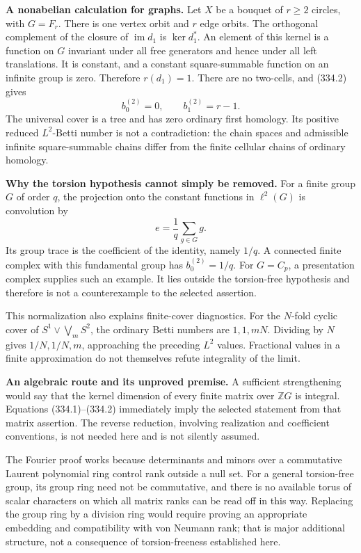 \documentclass[11pt]{article}
\begin{document}
\textbf{A nonabelian calculation for graphs.} Let $X$ be a bouquet of $r\geq2$ circles, with $G=F_r$. There is one vertex orbit and $r$ edge orbits. The orthogonal complement of the closure of $\operatorname{im}d_1$ is $\ker d_1^*$. An element of this kernel is a function on $G$ invariant under all free generators and hence under all left translations. It is constant, and a constant square-summable function on an infinite group is zero. Therefore $r(d_1)=1$. There are no two-cells, and (334.2) gives
\[
 b_0^{(2)}=0,\qquad b_1^{(2)}=r-1.
\]
The universal cover is a tree and has zero ordinary first homology. Its positive reduced $L^2$-Betti number is not a contradiction: the chain spaces and admissible infinite square-summable chains differ from the finite cellular chains of ordinary homology.

\textbf{Why the torsion hypothesis cannot simply be removed.} For a finite group $G$ of order $q$, the projection onto the constant functions in $\ell^2(G)$ is convolution by
\[
 e=\frac1q\sum_{g\in G}g.
\]
Its group trace is the coefficient of the identity, namely $1/q$. A connected finite complex with this fundamental group has $b_0^{(2)}=1/q$. For $G=C_p$, a presentation complex supplies such an example. It lies outside the torsion-free hypothesis and therefore is not a counterexample to the selected assertion.

This normalization also explains finite-cover diagnostics. For the $N$-fold cyclic cover of $S^1\vee\bigvee_m S^2$, the ordinary Betti numbers are $1,1,mN$. Dividing by $N$ gives $1/N,1/N,m$, approaching the preceding $L^2$ values. Fractional values in a finite approximation do not themselves refute integrality of the limit.

\textbf{An algebraic route and its unproved premise.} A sufficient strengthening would say that the kernel dimension of every finite matrix over $\mathbb ZG$ is integral. Equations (334.1)--(334.2) immediately imply the selected statement from that matrix assertion. The reverse reduction, involving realization and coefficient conventions, is not needed here and is not silently assumed.

The Fourier proof works because determinants and minors over a commutative Laurent polynomial ring control rank outside a null set. For a general torsion-free group, its group ring need not be commutative, and there is no available torus of scalar characters on which all matrix ranks can be read off in this way. Replacing the group ring by a division ring would require proving an appropriate embedding and compatibility with von Neumann rank; that is major additional structure, not a consequence of torsion-freeness established here.
\end{document}
